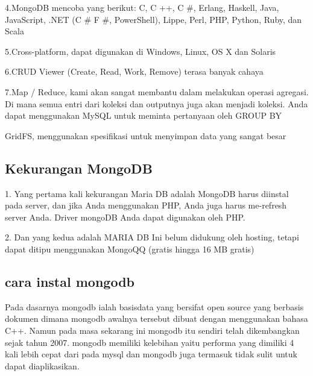 4.MongoDB mencoba yang berikut: C, C ++, C #, Erlang, Haskell, Java, JavaScript, .NET (C # F #, PowerShell), Lippe, Perl, PHP, Python, Ruby, dan Scala

5.Cross-platform, dapat digunakan di Windows, Linux, OS X dan Solaris

6.CRUD Viewer (Create, Read, Work, Remove) terasa banyak cahaya

7.Map / Reduce, kami akan sangat membantu dalam melakukan operasi agregasi. Di mana semua entri dari koleksi dan outputnya juga akan menjadi koleksi. Anda dapat menggunakan MySQL untuk meminta pertanyaan oleh GROUP BY

GridFS, menggunakan spesifikasi untuk menyimpan data yang sangat besar

\subsection {Kekurangan MongoDB}
1.	Yang pertama kali kekurangan Maria DB adalah MongoDB harus diinstal pada server, dan jika Anda menggunakan PHP, Anda juga harus me-refresh server Anda. Driver mongoDB Anda dapat digunakan oleh PHP.

2.	Dan yang kedua adalah MARIA DB Ini belum didukung oleh hosting, tetapi dapat ditipu menggunakan MongoQQ (gratis hingga 16 MB gratis)

\subsection {cara instal mongodb}
	Pada dasarnya mongodb ialah basisdata yang bersifat open source yang berbasis dokumen dimana mongodb awalnya tersebut dibuat dengan menggunakan bahasa C++. Namun pada masa sekarang ini mongodb itu sendiri telah dikembangkan sejak tahun 2007. mongodb memiliki kelebihan yaitu performa yang dimiliki 4 kali lebih cepat dari pada mysql dan mongodb juga termasuk tidak sulit untuk dapat diaplikasikan.
	
